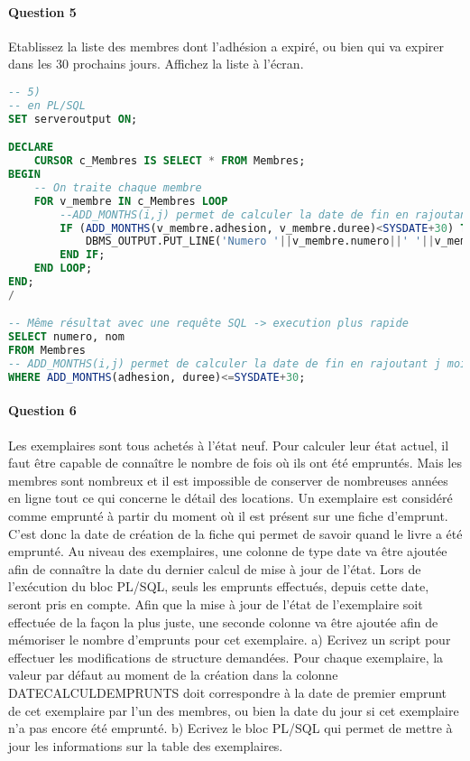 \documentclass[10pt, oneside]{article}
\begin{document}

\paragraph{Question 5} Etablissez la liste des membres dont l'adhésion a expiré, ou bien qui va expirer dans les 30 prochains jours. Affichez la liste à l'écran.

\begin{lstlisting}[language=sql, title=Question 5, label=QIV5]
-- 5)
-- en PL/SQL
SET serveroutput ON;

DECLARE
	CURSOR c_Membres IS SELECT * FROM Membres;
BEGIN
	-- On traite chaque membre
	FOR v_membre IN c_Membres LOOP
		--ADD_MONTHS(i,j) permet de calculer la date de fin en rajoutant j mois à la date i
		IF (ADD_MONTHS(v_membre.adhesion, v_membre.duree)<SYSDATE+30) THEN
			DBMS_OUTPUT.PUT_LINE('Numero '||v_membre.numero||' '||v_membre.nom);
		END IF;
	END LOOP;
END;
/

-- Même résultat avec une requête SQL -> execution plus rapide
SELECT numero, nom
FROM Membres
-- ADD_MONTHS(i,j) permet de calculer la date de fin en rajoutant j mois à la date i
WHERE ADD_MONTHS(adhesion, duree)<=SYSDATE+30;
\end{lstlisting}


\paragraph{Question 6} Les exemplaires sont tous achetés à l'état neuf. Pour calculer leur état actuel, il faut être capable de connaître le nombre de fois où ils ont été empruntés. Mais les membres sont nombreux et il est impossible de conserver de nombreuses années en ligne tout ce qui concerne le détail des locations.
Un exemplaire est considéré comme emprunté à partir du moment où il est présent sur une fiche d'emprunt. C'est donc la date de création de la fiche qui permet de savoir quand le livre a été emprunté.
Au niveau des exemplaires, une colonne de type date va être ajoutée afin de connaître la date du dernier calcul de mise à jour de l'état. Lors de l'exécution du bloc PL/SQL, seuls les emprunts effectués, depuis cette date, seront pris en compte. Afin que la mise à jour de l'état de l'exemplaire soit effectuée de la façon la plus juste, une seconde colonne va être ajoutée afin de mémoriser le nombre d'emprunts pour cet exemplaire.
a) Ecrivez un script pour effectuer les modifications de structure demandées.
Pour chaque exemplaire, la valeur par défaut au moment de la création dans la colonne DATECALCULDEMPRUNTS doit correspondre à la date de premier emprunt de cet exemplaire par l'un des membres, ou bien la date du jour si cet exemplaire n'a pas encore été emprunté.
b) Ecrivez le bloc PL/SQL qui permet de mettre à jour les informations sur la table des exemplaires.
\end{document}
